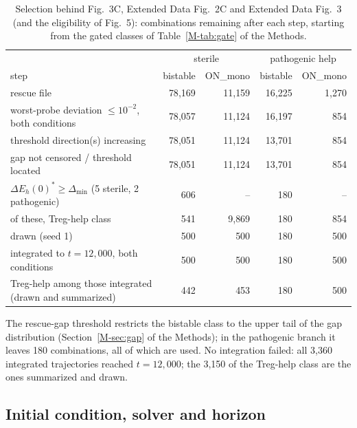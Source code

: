 \documentclass[11pt]{article}
\newcommand{\gap}{\Delta E_h(0)^{*}}
\begin{document}
\begin{table}[H]
\centering
\caption{Selection behind Fig.~3C, Extended Data Fig.~2C and Extended Data Fig.~3 (and the eligibility of Fig.~5): combinations remaining after each step, starting from the gated classes of Table~\ref{M-tab:gate} of the Methods.}
\label{tab:lbgate}
\begin{tabular}{lrrrr}
\toprule
 & \multicolumn{2}{c}{sterile} & \multicolumn{2}{c}{pathogenic help}\\
step & bistable & ON\_mono & bistable & ON\_mono\\
\midrule
rescue file & 78{,}169 & 11{,}159 & 16{,}225 & 1{,}270\\
worst-probe deviation $\le 10^{-2}$, both conditions & 78{,}057 & 11{,}124 & 16{,}197 & 854\\
threshold direction(s) increasing & 78{,}051 & 11{,}124 & 13{,}701 & 854\\
gap not censored / threshold located & 78{,}051 & 11{,}124 & 13{,}701 & 854\\
$\gap \ge \Delta_{\min}$ (5 sterile, 2 pathogenic) & 606 & -- & 180 & --\\
of these, Treg-help class & 541 & 9{,}869 & 180 & 854\\
drawn (seed 1) & 500 & 500 & 180 & 500\\
integrated to $t = 12{,}000$, both conditions & 500 & 500 & 180 & 500\\
Treg-help among those integrated (drawn and summarized) & 442 & 453 & 180 & 500\\
\bottomrule
\end{tabular}
\end{table}
The rescue-gap threshold restricts the bistable class to the upper tail of the gap
distribution (Section~\ref{M-sec:gap} of the Methods); in the pathogenic branch it leaves 180
combinations, all of which are used. No integration failed: all 3{,}360 integrated
trajectories reached $t=12{,}000$; the 3{,}150 of the Treg-help class are the ones summarized
and drawn.

\subsection{Initial condition, solver and horizon}
\end{document}
